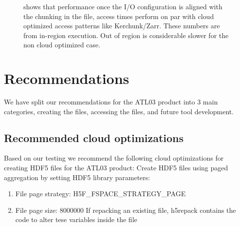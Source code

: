 \documentclass[
]{agujournal2019}
\providecommand{\tightlist}{%
  \setlength{\itemsep}{0pt}\setlength{\parskip}{0pt}}\usepackage{longtable,booktabs,array}
\begin{document}
\begin{figure}


\caption{\label{fig-5}shows that performance once the I/O configuration
is aligned with the chunking in the file, access times perform on par
with cloud optimized access patterns like Kerchunk/Zarr. These numbers
are from in-region execution. Out of region is considerable slower for
the non cloud optimized case.}

\end{figure}%

\section{Recommendations}\label{recommendations}

We have split our recommendations for the ATL03 product into 3 main
categories, creating the files, accessing the files, and future tool
development.

\subsection{Recommended cloud
optimizations}\label{recommended-cloud-optimizations}

Based on our testing we recommend the following cloud optimizations for
creating HDF5 files for the ATL03 product: Create HDF5 files using paged
aggregation by setting HDF5 library parameters:

\begin{enumerate}
\def\labelenumi{\arabic{enumi}.}
\tightlist
\item
  File page strategy: H5F\_FSPACE\_STRATEGY\_PAGE
\item
  File page size: 8000000 If repacking an existing file, h5repack
  contains the code to alter tese variables inside the file
\end{enumerate}
\end{document}
